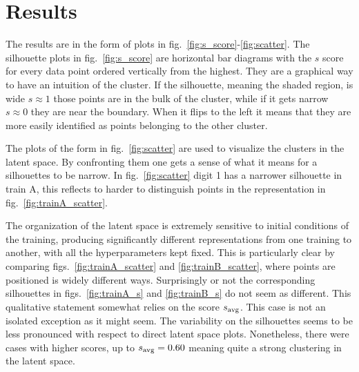 \documentclass[twocolumn,gsifonts,twoside]{gsipaper}
\begin{document}
\section{Results}
The results are in the form of plots in fig.~\ref{fig:s_score}-\ref{fig:scatter}. The silhouette plots in fig.~\ref{fig:s_score} are horizontal bar diagrams with the $s$ score for every data point ordered vertically from the highest. They are a graphical way to have an intuition of the cluster. If the silhouette, meaning the shaded region, is wide $s\approx1$ those points are in the bulk of the cluster, while if it gets narrow $s\approx0$ they are near the boundary. When it flips to the left it means that they are more easily identified as points belonging to the other cluster.

The plots of the form in fig.~\ref{fig:scatter} are used to visualize the clusters in the latent space. By confronting them one gets a sense of what it means for a silhouettes to be narrow. In fig.~\ref{fig:scatter} digit 1 has a narrower silhouette in train A, this reflects to harder to distinguish points in the representation in fig.~\ref{fig:trainA_scatter}.

The organization of the latent space is extremely sensitive to initial conditions of the training, producing significantly different representations from one training to another, with all the hyperparameters kept fixed. This is particularly clear by comparing figs.~\ref{fig:trainA_scatter} and \ref{fig:trainB_scatter}, where points are positioned is widely different ways. Surprisingly or not the corresponding silhouettes in figs.~\ref{fig:trainA_s} and \ref{fig:trainB_s} do not seem as different. This qualitative statement somewhat relies on the score $s_\textup{avg}$. This case is not an isolated exception as it might seem. The variability on the silhouettes seems to be less pronounced with respect to direct latent space plots. Nonetheless, there were cases with higher scores, up to $s_\textup{avg} = 0.60$ meaning quite a strong clustering in the latent space.
\end{document}
